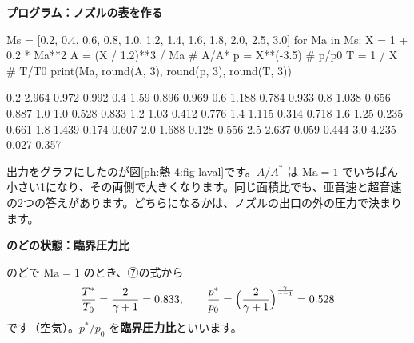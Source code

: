 \noindent\textbf{プログラム：ノズルの表を作る}\par\nobreak
\begin{phcode}[Python]
Ms = [0.2, 0.4, 0.6, 0.8, 1.0, 1.2, 1.4,
      1.6, 1.8, 2.0, 2.5, 3.0]
for Ma in Ms:
    X = 1 + 0.2 * Ma**2
    A = (X / 1.2)**3 / Ma          \# A/A*
    p = X**(-3.5)                  \# p/p0
    T = 1 / X                      \# T/T0
    print(Ma, round(A, 3), round(p, 3), round(T, 3))
\end{phcode}
\begin{phcodeout}
0.2 2.964 0.972 0.992
0.4 1.59 0.896 0.969
0.6 1.188 0.784 0.933
0.8 1.038 0.656 0.887
1.0 1.0 0.528 0.833
1.2 1.03 0.412 0.776
1.4 1.115 0.314 0.718
1.6 1.25 0.235 0.661
1.8 1.439 0.174 0.607
2.0 1.688 0.128 0.556
2.5 2.637 0.059 0.444
3.0 4.235 0.027 0.357
\end{phcodeout}
出力をグラフにしたのが図\ref{ph:熱-4:fig-laval}です。$A/A^*$ は $\mathrm{Ma}=1$ でいちばん小さい1になり、その両側で大きくなります。同じ面積比でも、亜音速と超音速の2つの答えがあります。どちらになるかは、ノズルの出口の外の圧力で決まります。

\begin{bkfigure}
\label{ph:熱-4:fig-laval}
\end{bkfigure}

\noindent\textbf{のどの状態：臨界圧力比}\par\nobreak
のどで $\mathrm{Ma}=1$ のとき、⑦の式から
\[ \frac{T^*}{T_0}=\frac{2}{\gamma+1}=0.833,\qquad \frac{p^*}{p_0}=\Bigl(\frac{2}{\gamma+1}\Bigr)^{\frac{\gamma}{\gamma-1}}=0.528 \]
です（空気）。$p^*/p_0$ を\textbf{臨界圧力比}といいます。

